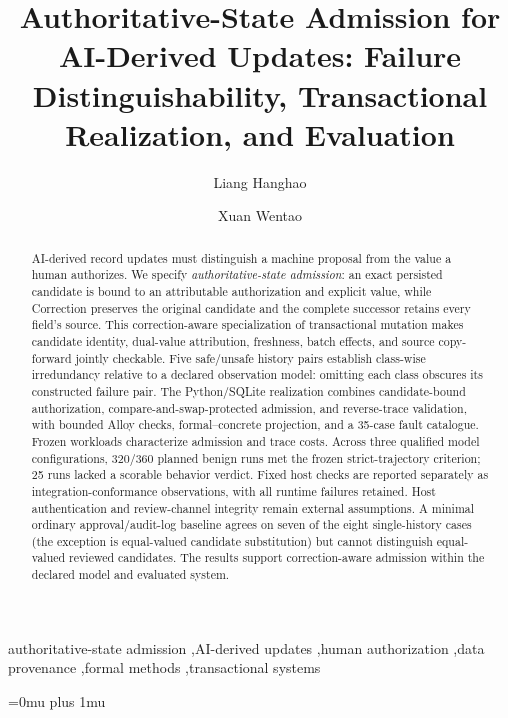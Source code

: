 \documentclass[preprint,12pt,authoryear]{elsarticle}
\begin{document}
\begin{frontmatter}

\title{Authoritative-State Admission for AI-Derived Updates: Failure Distinguishability, Transactional Realization, and Evaluation}

\author[inst1]{Liang Hanghao}
\author[inst1]{Xuan Wentao}

\begin{abstract}
AI-derived record updates must distinguish a machine proposal from the value a human authorizes. We specify \emph{authoritative-state admission}: an exact persisted candidate is bound to an attributable authorization and explicit value, while Correction preserves the original candidate and the complete successor retains every field's source. This correction-aware specialization of transactional mutation makes candidate identity, dual-value attribution, freshness, batch effects, and source copy-forward jointly checkable. Five safe/unsafe history pairs establish class-wise irredundancy relative to a declared observation model: omitting each class obscures its constructed failure pair. The Python/SQLite realization combines candidate-bound authorization, compare-and-swap-protected admission, and reverse-trace validation, with bounded Alloy checks, formal--concrete projection, and a 35-case fault catalogue. Frozen workloads characterize admission and trace costs. Across three qualified model configurations, 320/360 planned benign runs met the frozen strict-trajectory criterion; 25 runs lacked a scorable behavior verdict. Fixed host checks are reported separately as integration-conformance observations, with all runtime failures retained. Host authentication and review-channel integrity remain external assumptions. A minimal ordinary approval/audit-log baseline agrees on seven of the eight single-history cases (the exception is equal-valued candidate substitution) but cannot distinguish equal-valued reviewed candidates. The results support correction-aware admission within the declared model and evaluated system.
\end{abstract}

\begin{keyword}
authoritative-state admission \sep AI-derived updates \sep human authorization \sep data provenance \sep formal methods \sep transactional systems
\end{keyword}

\end{frontmatter}














\begingroup
\Urlmuskip=0mu plus 1mu\relax

\endgroup
\end{document}
